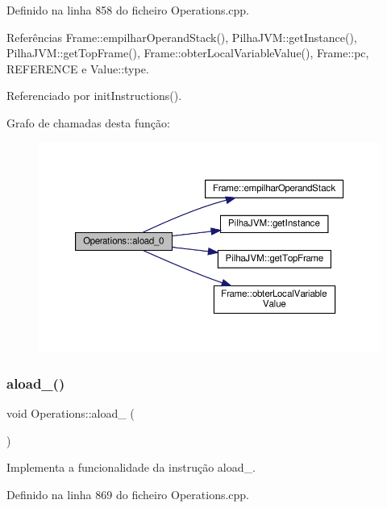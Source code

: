 Definido na linha 858 do ficheiro Operations.\+cpp.



Referências Frame\+::empilhar\+Operand\+Stack(), Pilha\+J\+V\+M\+::get\+Instance(), Pilha\+J\+V\+M\+::get\+Top\+Frame(), Frame\+::obter\+Local\+Variable\+Value(), Frame\+::pc, R\+E\+F\+E\+R\+E\+N\+CE e Value\+::type.



Referenciado por init\+Instructions().

Grafo de chamadas desta função\+:\nopagebreak
\begin{figure}[H]
\begin{center}
\leavevmode
\includegraphics[width=350pt]{classOperations_a9d821a16ef0681755717e8c4f740f6d0_cgraph}
\end{center}
\end{figure}
\mbox{\label{classOperations_a8291f2b716c1be7428d9b63a5225b52d}} 
\subsubsection{\texorpdfstring{aload\+\_()}{aload\_1()}}
{\footnotesize\ttfamily void Operations\+::aload\+\_ (\begin{DoxyParamCaption}{ }\end{DoxyParamCaption})\hspace{0.3cm}{\ttfamily [private]}}



Implementa a funcionalidade da instrução aload\+\_. 



Definido na linha 869 do ficheiro Operations.\+cpp.



